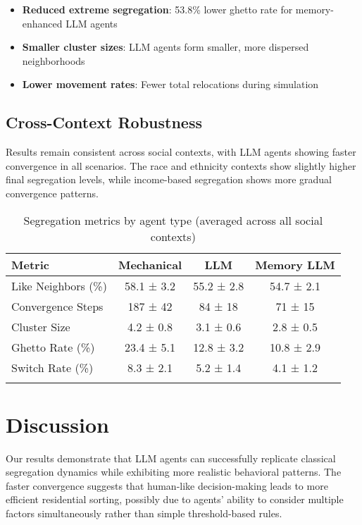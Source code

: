 \documentclass[pdflatex,sn-basic]{sn-jnl}%
\theoremstyle{thmstyleone}%
\theoremstyle{thmstyletwo}%
\theoremstyle{thmstylethree}%
\begin{document}
\begin{itemize}
\item \textbf{Reduced extreme segregation}: 53.8\% lower ghetto rate for memory-enhanced LLM agents
\item \textbf{Smaller cluster sizes}: LLM agents form smaller, more dispersed neighborhoods
\item \textbf{Lower movement rates}: Fewer total relocations during simulation
\end{itemize}

\subsection{Cross-Context Robustness}

Results remain consistent across social contexts, with LLM agents showing faster convergence in all scenarios. The race and ethnicity contexts show slightly higher final segregation levels, while income-based segregation shows more gradual convergence patterns.

\begin{table}[h]
\caption{Segregation metrics by agent type (averaged across all social contexts)}\label{tab:segregation}
\begin{tabular}{@{}lccc@{}}
\toprule
Metric & Mechanical & LLM & Memory LLM \\
\midrule
Like Neighbors (\%) & 58.1 ± 3.2 & 55.2 ± 2.8 & 54.7 ± 2.1 \\
Convergence Steps & 187 ± 42 & 84 ± 18 & 71 ± 15 \\
Cluster Size & 4.2 ± 0.8 & 3.1 ± 0.6 & 2.8 ± 0.5 \\
Ghetto Rate (\%) & 23.4 ± 5.1 & 12.8 ± 3.2 & 10.8 ± 2.9 \\
Switch Rate (\%) & 8.3 ± 2.1 & 5.2 ± 1.4 & 4.1 ± 1.2 \\
\botrule
\end{tabular}
\end{table}

\section{Discussion}\label{sec:discussion}

Our results demonstrate that LLM agents can successfully replicate classical segregation dynamics while exhibiting more realistic behavioral patterns. The faster convergence suggests that human-like decision-making leads to more efficient residential sorting, possibly due to agents' ability to consider multiple factors simultaneously rather than simple threshold-based rules.
\end{document}
